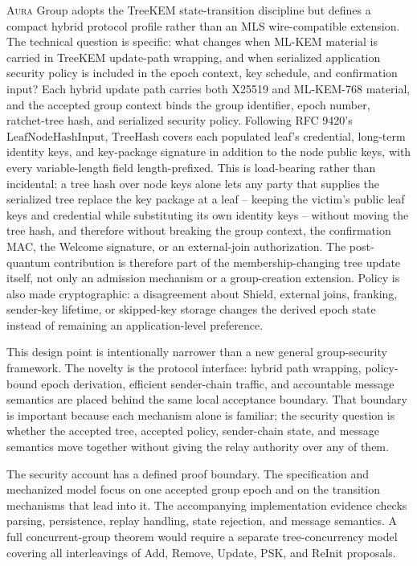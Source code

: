 \documentclass[preprint,12pt]{elsarticle}
\theoremstyle{definition}
\newcommand{\tech}[1]{\textnormal{#1}}
\renewcommand{\mathsf}[1]{\mathrm{#1}}
\newcommand{\Aura}{\textsc{Aura}}
\newcommand{\Shield}{\tech{Shield}}
\renewcommand{\DH}{\tech{X25519}}
\newcommand{\KEM}{\tech{ML-KEM-768}}
\begin{document}
\Aura{} Group adopts the TreeKEM state-transition discipline but defines a
compact hybrid protocol profile rather than an MLS wire-compatible extension.
The technical question is specific: what changes when ML-KEM material is
carried in TreeKEM update-path wrapping, and when serialized application
security policy is included in the epoch context, key schedule, and
confirmation input? Each hybrid update path carries both \DH{} and \KEM{}
material, and the accepted group context binds the group identifier, epoch
number, ratchet-tree hash, and serialized security policy.  Following RFC 9420's
$\mathsf{LeafNodeHashInput}$, $\mathsf{TreeHash}$ covers each populated leaf's
credential, long-term identity keys, and key-package signature in addition to
the node public keys, with every variable-length field length-prefixed.  This is
load-bearing rather than incidental: a tree hash over node keys alone lets any
party that supplies the serialized tree replace the key package at a leaf --
keeping the victim's public leaf keys and credential while substituting its own
identity keys -- without moving the tree hash, and therefore without breaking
the group context, the confirmation MAC, the Welcome signature, or an
external-join authorization. The post-quantum
contribution is therefore part of the membership-changing tree update itself,
not only an admission mechanism or a group-creation extension. Policy is also
made cryptographic: a disagreement about \Shield{}, external joins, franking,
sender-key lifetime, or skipped-key storage changes the derived epoch state
instead of remaining an application-level preference.

This design point is intentionally narrower than a new general group-security
framework. The novelty is the protocol interface: hybrid path wrapping,
policy-bound epoch derivation, efficient sender-chain traffic, and accountable
message semantics are placed behind the same local acceptance boundary. That
boundary is important because each mechanism alone is familiar; the security
question is whether the accepted tree, accepted policy, sender-chain state, and
message semantics move together without giving the relay authority over any of
them.

The security account has a defined proof boundary. The specification and
mechanized model focus on one accepted group epoch and on the transition
mechanisms that lead into it. The accompanying implementation evidence checks
parsing, persistence, replay handling, state rejection, and message semantics.
A full concurrent-group theorem would require a separate tree-concurrency
model covering all interleavings of Add, Remove, Update, PSK, and ReInit
proposals.
\end{document}
